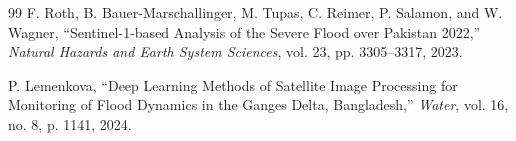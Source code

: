 \documentclass[11pt,a4paper,oneside]{report}
\begin{document}
\begin{thebibliography}{99}
F. Roth, B. Bauer-Marschallinger, M. Tupas, C. Reimer, P. Salamon, and W. Wagner, ``Sentinel-1-based Analysis of the Severe Flood over Pakistan 2022,'' \emph{Natural Hazards and Earth System Sciences}, vol. 23, pp. 3305--3317, 2023.

P. Lemenkova, ``Deep Learning Methods of Satellite Image Processing for Monitoring of Flood Dynamics in the Ganges Delta, Bangladesh,'' \emph{Water}, vol. 16, no. 8, p. 1141, 2024.

\end{thebibliography}
\end{document}
